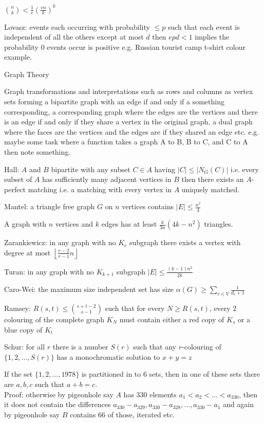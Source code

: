 $\binom{n}{k} < \frac{1}{e} \left( \frac{en}{k} \right)^k$

Lovasz: events each occurring with probability $\le p$ such that each event is independent of all the others except at most $d$ then $epd < 1$ implies the probability $0$ events occur is positive e.g. Russian tourist camp t-shirt colour example.

Graph Theory

Graph transformations and interpretations such as rows and columns as vertex sets forming a bipartite graph with an edge if and only if a something corresponding, a corresponding graph where the edges are the vertices and there is an edge if and only if they share a vertex in the original graph, a dual graph where the faces are the vertices and the edges are if they shared an edge etc. e.g. maybe some task where a function takes a graph A to B, B to C, and C to A then note something.

Hall: $A$ and $B$ bipartite with any subset $C \in A$ having $|C| \le |N_G (C)|$ i.e. every subset of $A$ has sufficiently many adjacent vertices in $B$ then there exists an $A$-perfect matching i.e. a matching with every vertex in $A$ uniquely matched.

Mantel: a triangle free graph $G$ on $n$ vertices contains $|E| \le \frac{n^2}{4}$

A graph with $n$ vertices and $k$ edges has at least $\frac{k}{3n}(4k-n^2)$ triangles.

Zarankiewicz: in any graph with no $K_r$ subgraph there exists a vertex with degree at most $\left\lfloor \frac{r-2}{r-1}n \right\rfloor$

Turan: in any graph with no $K_{k+1}$ subgraph $|E| \le \frac{(k-1)n^2}{2k}$

Caro-Wei: the maximum size independent set has size $\alpha (G) \ge \sum_{v \in V} \frac{1}{d_v+1}$

Ramsey: $R(s,t) \le \binom{s+t-2}{s-1}$ such that for every $N \ge R(s,t)$, every $2$ colouring of the complete graph $K_N$ must contain either a red copy of $K_s$ or a blue copy of $K_t$

Schur: for all $r$ there is a number $S(r)$ such that any $r$-colouring of $\{1,2,\dots,S(r) \}$ has a monochromatic solution to $x+y=z$

If the set $\{1,2,\dots,1978\}$ is partitioned in to $6$ sets, then in one of these sets there are $a,b,c$ such that $a+b=c$. \\
Proof: otherwise by pigeonhole say $A$ has $330$ elements $a_1 < a_2 < \dots < a_{330}$, then it does not contain the differences $a_{330}-a_{329},a_{330}-a_{328},\dots,a_{330}-a_1$ and again by pigeonhole say $B$ contains $66$ of those, iterated etc.

